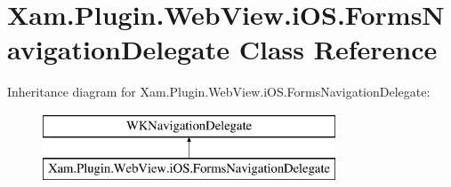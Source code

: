 \hypertarget{class_xam_1_1_plugin_1_1_web_view_1_1i_o_s_1_1_forms_navigation_delegate}{}\section{Xam.\+Plugin.\+Web\+View.\+i\+O\+S.\+Forms\+Navigation\+Delegate Class Reference}
\label{class_xam_1_1_plugin_1_1_web_view_1_1i_o_s_1_1_forms_navigation_delegate}
Inheritance diagram for Xam.\+Plugin.\+Web\+View.\+i\+O\+S.\+Forms\+Navigation\+Delegate\+:\begin{figure}[H]
\begin{center}
\leavevmode
\includegraphics[height=2.000000cm]{class_xam_1_1_plugin_1_1_web_view_1_1i_o_s_1_1_forms_navigation_delegate}
\end{center}
\end{figure}

